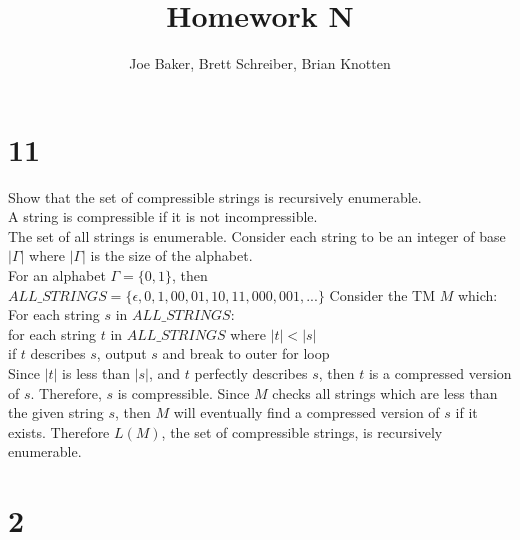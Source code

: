 \documentclass[letterpaper,notitlepage,twoside]{article}
\newcommand\tab[1][1cm]{\hspace*{#1}} %
\begin{document}
\title{Homework N}
\author{Joe Baker, Brett Schreiber, Brian Knotten}
\maketitle

\section*{11}

Show that the set of compressible strings is recursively enumerable.\\
A string is compressible if it is not incompressible.\\
The set of all strings is enumerable. Consider each string to be an integer of base $|\Gamma|$ where $|\Gamma|$ is the size of the alphabet. \\
For an alphabet $\Gamma = \{0, 1\}$, then $ALL\_STRINGS = \{\epsilon, 0, 1, 00, 01, 10, 11, 000, 001,...\}$
Consider the TM $M$ which: \\
For each string $s$ in $ALL\_STRINGS$: \\
	\tab for each string $t$ in $ALL\_STRINGS$ where $|t| < |s|$ \\
		\tab\tab if $t$ describes $s$, output $s$ and break to outer for loop \\		
Since $|t|$ is less than $|s|$, and $t$ perfectly describes $s$, then $t$ is a compressed version of $s$. Therefore, $s$ is compressible. Since $M$ checks all strings which are less than the given string $s$, then $M$ will eventually find a compressed version of $s$ if it exists. Therefore $L(M)$, the set of compressible strings, is recursively enumerable.

\section*{2}
\end{document}
